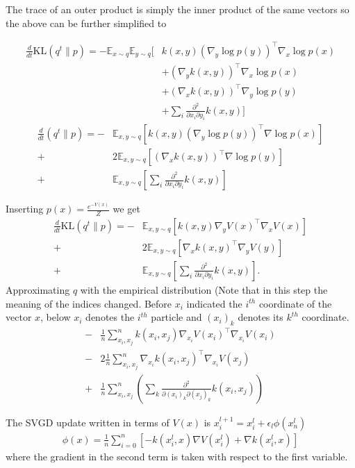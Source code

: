 \documentclass{article}
\begin{document}
The trace of an outer product is simply the inner product of the same vectors so the above can 
be further simplified to

\begin{align}
    \frac{d}{dt} \text{KL}( q^t \| p ) = - \mathbb{E}_{x\sim q} \mathbb{E}_{y \sim q} \big[
        & k(x,y) (\nabla_y \log p(y))^\top \nabla_x \log p(x) \\
        &+ (\nabla_y k(x,y) )^\top \nabla_x \log p(x) \\
        &+ (\nabla_x k(x,y) )^\top \nabla_y \log p(y) \\
        &+ \sum_i \frac{ \partial^2 }{ \partial x_i \partial y_i } k(x,y) \big]
\end{align}
\begin{align}
    \frac{d}{dt}    ( q^t \| p ) =
    -& \mathbb{E}_{x,y\sim q} \left[ k(x,y) (\nabla_y \log p(y))^\top \nabla \log p(x) \right] \\ 
    +& 2 \mathbb{E}_{x,y\sim q} \left[ (\nabla_x k(x,y) )^\top \nabla \log p(y) \right] \\ 
    +& \mathbb{E}_{x,y\sim q} \left[ \sum_i \frac{ \partial^2 }{ \partial x_i \partial y_i } k(x,y) \right]
\end{align}

Inserting $p(x) = \frac{e^{-V(x)}}{Z}$ we get
\begin{align}
    \frac{d}{dt} \text{KL}( q^t \| p ) =
    -& \mathbb{E}_{x,y\sim q} \left[ k(x,y) \nabla_y V(x)^\top \nabla_x V(x) \right] \\ 
    +& 2 \mathbb{E}_{x,y\sim q} \left[ \nabla_x k(x,y)^\top \nabla_y V(y) \right] \\ 
    +& \mathbb{E}_{x,y\sim q} \left[ \sum_i \frac{ \partial^2 }{ \partial x_i \partial y_i } k(x,y) \right]
    .
\end{align}
Approximating $q$ with the empirical distribution
(Note that in this step the meaning of the indices changed. Before $x_i$ indicated the $i^{th}$
coordinate of the vector $x$, below $x_i$ denotes the $i^{th}$ particle and $(x_i)_k$ denotes
its $k^{th}$ coordinate.
\begin{align}
    -& \frac{1}{n}\sum_{x_i,x_j}^n  k(x_i,x_j) \nabla_{x_i} V(x_i)^\top \nabla_{x_i} V(x_i)  \\ 
    -& 2 \frac{1}{n}\sum_{x_i,x_j}^n  \nabla_{x_i} k(x_i,x_j)^\top \nabla_{x_i} V(x_j)  \\ 
    +& \frac{1}{n}\sum_{x_i,x_j}^n \left( \sum_k \frac{ \partial^2 }{ \partial (x_i)_k \partial (x_j)_k } 
        k(x_i,x_j) \right)
\end{align}

The SVGD update written in terms of $V(x)$ is $x_i^{l+1} = x_i^l + \epsilon_l \phi(x_n^l)$
\begin{align}
    \phi(x) = \frac{1}{n} \sum_{i=0}^{n} \left[
        - k(x_i^l, x) \nabla V(x_i^l) + \nabla k(x_i^l, x)
    \right]
\end{align}
where the gradient in the second term is taken with respect to the first variable.
\end{document}
